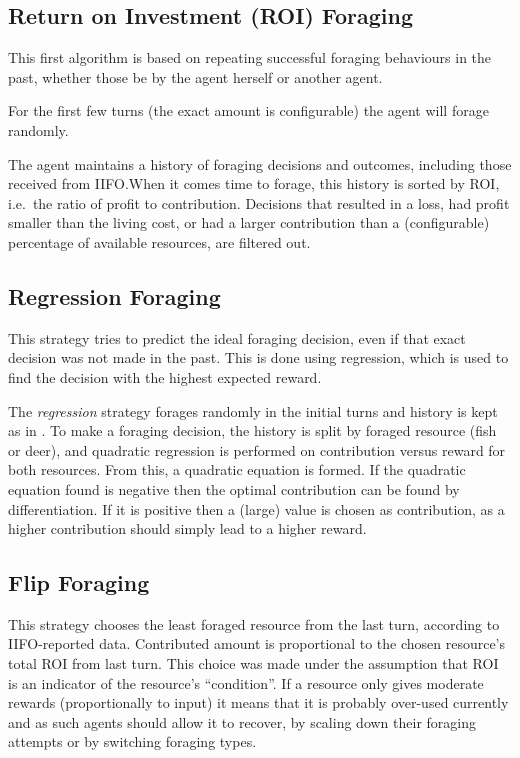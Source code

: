 \subsection{Return on Investment (ROI) Foraging}%
\label{sec:forage-roi}

This first algorithm is based on repeating successful foraging behaviours in the past, whether those be by the agent herself or another agent.

For the first few turns (the exact amount is configurable) the agent will forage randomly.

The agent maintains a history of foraging decisions and outcomes, including those received from IIFO.\@ When it comes time to forage, this history is sorted by ROI, i.e.\ the ratio of profit to contribution. Decisions that resulted in a loss, had profit smaller than the living cost, or had a larger contribution than a (configurable) percentage of available resources, are filtered out.

\subsection{Regression Foraging}%
\label{sec:forage-regression}

This strategy tries to predict the ideal foraging decision, even if that exact decision was not made in the past. This is done using regression, which is used to find the decision with the highest expected reward.

The \emph{regression} strategy forages randomly in the initial turns and history is kept as in . To make a foraging decision, the history is split by foraged resource (fish or deer), and quadratic regression is performed on contribution versus reward for both resources. From this, a quadratic equation is formed. If the quadratic equation found is negative then the optimal contribution can be found by differentiation. If it is positive then a (large) value is chosen as contribution, as a higher contribution should simply lead to a higher reward.

\subsection{Flip Foraging}

This strategy chooses the least foraged resource from the last turn, according to IIFO-reported data. Contributed amount is proportional to the chosen resource's total ROI from last turn. This choice was made under the assumption that ROI is an indicator of the resource's ``condition''. If a resource only gives moderate rewards (proportionally to input) it means that it is probably over-used currently and as such agents should allow it to recover, by scaling down their foraging attempts or by switching foraging types.

